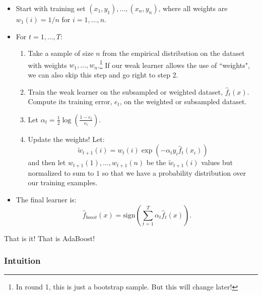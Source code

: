 \begin{itemize}
\item Start with training set $(x_1,y_1),\ldots,(x_n,y_n)$, where all weights are $w_1(i) = 1/n$ for $i=1,\ldots,n$.
\item For $t=1,\ldots,T$:
\begin{enumerate}
\item Take a sample of size $n$ from the empirical distribution on the dataset with weights $w_1,\ldots,w_n$.\footnote{In round 1, this is just a bootstrap sample. But this will change later!} If our weak learner allows the use of ``weights", we can also skip this step and go right to step 2. 
\item Train the weak learner on the subsampled or weighted dataset, $\hat{f}_t(x)$. Compute its training error, $e_t$, on the weighted or subsampled dataset. 
\item Let $\alpha_t = \frac{1}{2} \log\left( \frac{1- e_t}{e_t} \right)$. 
\item Update the weights! Let:
$$
\tilde{w}_{t+1}(i) = w_t(i) \exp \left( -\alpha_t y_i \hat{f}_t(x_i)\right)
$$
and then let $w_{t+1}(1), \ldots, w_{t+1}(n)$ be the $\tilde{w}_{t+1}(i)$ values but normalized to sum to $1$ so that we have a probability distribution over our training examples.  
\end{enumerate}
\item The final learner is:
$$
\hat{f}_{boost}(x) = \text{sign}\left( \sum_{t=1}^T \alpha_t \hat{f}_t(x) \right).
$$
\end{itemize}
That is it! That is AdaBoost! 

\subsubsection{Intuition}

